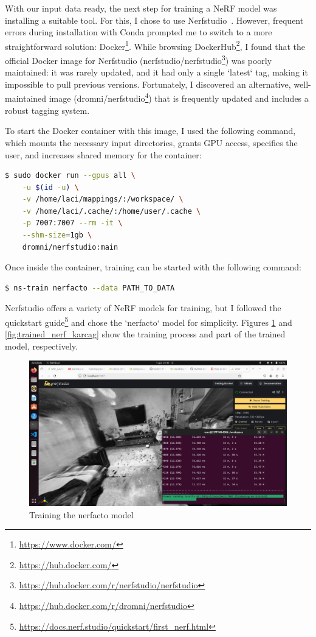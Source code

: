 With our input data ready, the next step for training a NeRF model was installing a suitable tool. For this, I chose to use Nerfstudio~\cite{nerfstudio}. However, frequent errors during installation with Conda prompted me to switch to a more straightforward solution: Docker\footnote{\url{https://www.docker.com/}}. While browsing DockerHub\footnote{\url{https://hub.docker.com/}}, I found that the official Docker image for Nerfstudio (nerfstudio/nerfstudio\footnote{\url{https://hub.docker.com/r/nerfstudio/nerfstudio}}) was poorly maintained: it was rarely updated, and it had only a single `latest` tag, making it impossible to pull previous versions. Fortunately, I discovered an alternative, well-maintained image (dromni/nerfstudio\footnote{\url{https://hub.docker.com/r/dromni/nerfstudio}}) that is frequently updated and includes a robust tagging system.

To start the Docker container with this image, I used the following command, which mounts the necessary input directories, grants GPU access, specifies the user, and increases shared memory for the container:

\FloatBarrier
\begin{lstlisting}[language=bash,frame=single,float=!ht]
$ sudo docker run --gpus all \
    -u $(id -u) \
    -v /home/laci/mappings/:/workspace/ \
    -v /home/laci/.cache/:/home/user/.cache \
    -p 7007:7007 --rm -it \
    --shm-size=1gb \
    dromni/nerfstudio:main
\end{lstlisting}

Once inside the container, training can be started with the following command:
\FloatBarrier
\begin{lstlisting}[language=bash,frame=single,float=!ht]
$ ns-train nerfacto --data PATH_TO_DATA
\end{lstlisting}

Nerfstudio offers a variety of NeRF models for training, but I followed the quickstart guide\footnote{\url{https://docs.nerf.studio/quickstart/first_nerf.html}} and chose the `nerfacto` model for simplicity. Figures \ref{fig:training_nerf_karcag} and \ref{fig:trained_nerf_karcag} show the training process and part of the trained model, respectively.

\begin{figure}[htbp]
	\centering
	\includegraphics[width=150mm, keepaspectratio]{figures/nerfstudio.png}
	\caption{Training the nerfacto model}
	\label{fig:training_nerf_karcag}
\end{figure}


